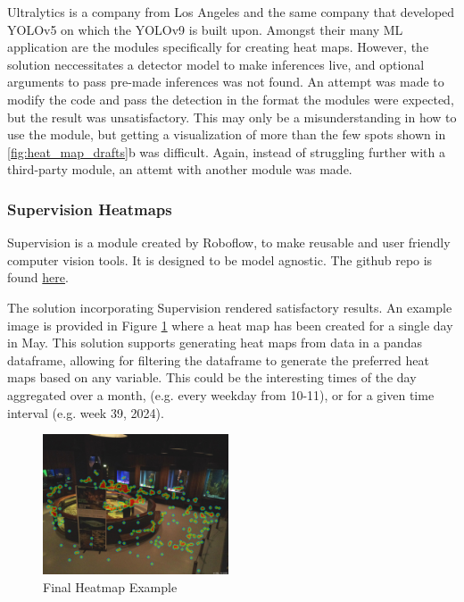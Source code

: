 Ultralytics is a company from Los Angeles and the same company that developed YOLOv5 on which the YOLOv9 is built upon. Amongst their many ML application are the modules specifically for creating heat maps. However, the solution neccessitates a detector model to make inferences live, and optional arguments to pass pre-made inferences was not found. An attempt was made to modify the code and pass the detection in the format the modules were expected, but the result was unsatisfactory. This may only be a misunderstanding in how to use the module, but getting a visualization of more than the few spots shown in \ref{fig:heat_map_drafts}b was difficult. Again, instead of struggling further with a third-party module, an attemt with another module was made.

\subsubsection{Supervision Heatmaps}
Supervision is a module created by Roboflow, to make reusable and user friendly computer vision tools. It is designed to be model agnostic. The github repo is found \href{https://github.com/roboflow/supervision}{here}.

The solution incorporating Supervision rendered satisfactory results. An example image is provided in Figure \ref{fig:heat_map_final_example} where a heat map has been created for a single day in May. This solution supports generating heat maps from data in a pandas dataframe, allowing for filtering the dataframe to generate the preferred heat maps based on any variable. This could be the interesting times of the day aggregated over a month, (e.g. every weekday from 10-11), or for a given time interval (e.g. week 39, 2024).

\begin{figure}[H]
    \centering
    \includegraphics[width=0.49\textwidth]{Images/Analytics/heatmap_day_10052024.jpg}
    \caption{Final Heatmap Example}
    \label{fig:heat_map_final_example}
\end{figure}
